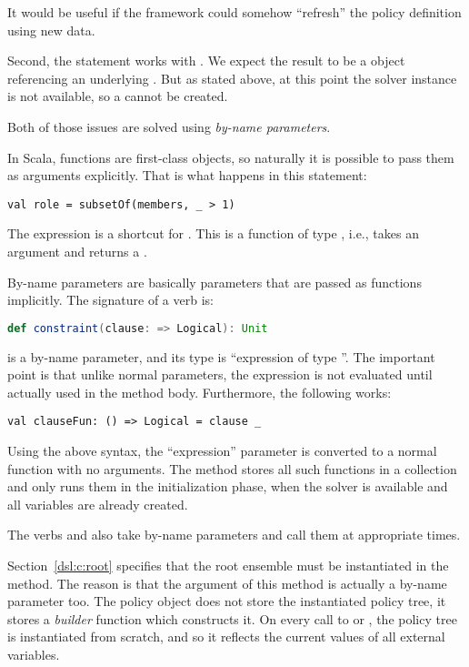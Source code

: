 It would be useful if the framework could somehow ``refresh'' the policy definition
using new data.

Second, the  statement works with . We expect the
result to be a  object referencing an underlying . But as stated
above, at this point the solver instance is not available, so a  cannot be
created.

Both of those issues are solved using \textit{by-name parameters}.

\medskip

In Scala, functions are first-class objects, so naturally it is possible to pass them as
arguments explicitly. That is what happens in this statement:
\begin{lstlisting}[style=snippet]
val role = subsetOf(members, _ > 1)
\end{lstlisting}
The expression  is a shortcut for . This is a function of
type , i.e., takes an  argument and returns a
.

By-name parameters are basically parameters that are passed as functions implicitly. The
signature of a  verb is:
\begin{lstlisting}[style=snippet, language=Scala]
def constraint(clause: => Logical): Unit
\end{lstlisting}
 is a by-name parameter, and its type is ``expression of type ''.
The important point is that unlike normal parameters, the expression is not evaluated
until actually used in the  method body. Furthermore, the following
works:
\begin{lstlisting}[style=snippet]
val clauseFun: () => Logical = clause _
\end{lstlisting}
Using the above syntax, the ``expression'' parameter is converted to a normal function
with no arguments. The  method stores all such functions in a collection
and only runs them in the  initialization phase, when the solver is
available and all variables are already created.

The verbs  and  also take by-name parameters and call them
at appropriate times.

\medskip

Section~\ref{dsl:c:root} specifies that the root ensemble must be instantiated in the
 method. The reason is that the argument of this method is actually a
by-name parameter too. The policy object does not store the instantiated policy tree, it
stores a \textit{builder} function which constructs it. On every call to  or
, the policy tree is instantiated from scratch, and so it reflects the
current values of all external variables.

